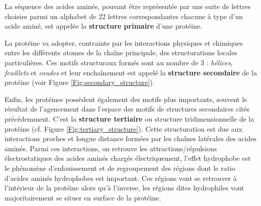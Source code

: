 La séquence des acides aminés, pouvant être représentée par une suite de lettres choisies parmi un alphabet de 22 lettres correspondantes chacune à type d'un acide aminé, est appelée la \textbf{structure primaire} d'une protéine.

La protéine va adopter, contrainte par les interactions physiques et chimiques entre les différents atomes de la chaîne principale, des structurations locales particulières. Ces motifs structuraux formés sont au nombre de 3 : \textit{hélices}, \textit{feuillets} et \textit{coudes} et leur enchaînement est appelé la \textbf{structure secondaire} de la protéine (voir Figure \ref{Fig:secondary_structure}).

Enfin, les protéines possèdent également des motifs plus importants, souvent le résultat de l'agencement dans l'espace des motifs de structures secondaires cités précédemment. C'est la \textbf{structure tertiaire} ou structure tridimensionnelle de la protéine (cf. Figure \ref{Fig:tertiary_structure}). 
Cette structuration est due aux interactions proches et longue distance formées par les chaînes latérales des acides aminés. Parmi ces interactions, on retrouve les attractions/répulsions électrostatiques des acides aminés chargés électriquement, l'effet hydrophobe est le phénomène d'enfouissement et de regroupement des régions dont le ratio d'acides aminés hydrophobes est important. Ces régions vont se retrouver à l'intérieur de la protéine alors qu'à l'inverse, les régions dites hydrophiles vont majoritairement se situer en surface de la protéine.

